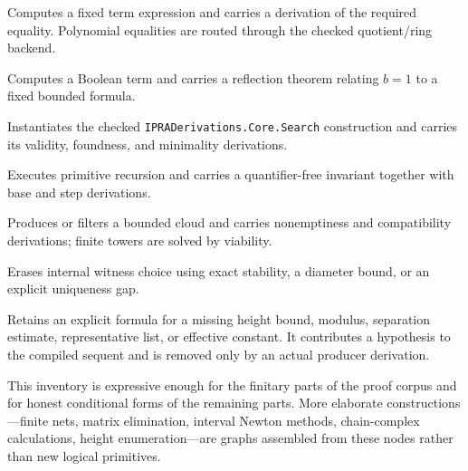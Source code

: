 \begin{description}[style=nextline,leftmargin=2.4em]
\item[Algebra node.] Computes a fixed term expression and carries a derivation of the required equality.  Polynomial equalities are routed through the checked quotient/ring backend.
\item[Boolean node.] Computes a Boolean term and carries a reflection theorem relating \(b=1\) to a fixed bounded formula.
\item[Search node.] Instantiates the checked \texttt{IPRADerivations.Core.Search} construction and carries its validity, foundness, and minimality derivations.
\item[Loop node.] Executes primitive recursion and carries a quantifier-free invariant together with base and step derivations.
\item[Relation node.] Produces or filters a bounded cloud and carries nonemptiness and compatibility derivations; finite towers are solved by viability.
\item[Observer node.] Erases internal witness choice using exact stability, a diameter bound, or an explicit uniqueness gap.
\item[Residual boundary node.] Retains an explicit formula for a missing height bound, modulus, separation estimate, representative list, or effective constant.  It contributes a hypothesis to the compiled sequent and is removed only by an actual producer derivation.
\end{description}

This inventory is expressive enough for the finitary parts of the proof corpus and for honest conditional forms of the remaining parts.  More elaborate constructions---finite nets, matrix elimination, interval Newton methods, chain-complex calculations, height enumeration---are graphs assembled from these nodes rather than new logical primitives.
